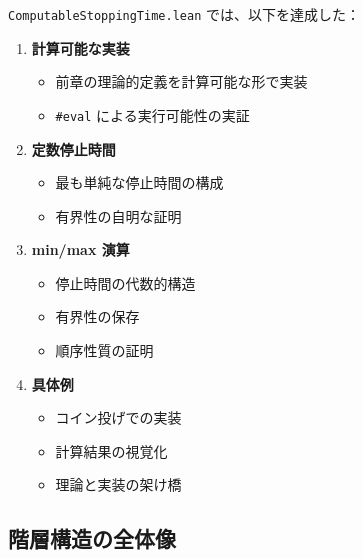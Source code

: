 \documentclass[12pt,a4paper,ja=standard]{bxjsarticle}
\theoremstyle{definition}
\begin{document}
\texttt{ComputableStoppingTime.lean} では、以下を達成した：

\begin{enumerate}
    \item \textbf{計算可能な実装}
    \begin{itemize}
        \item 前章の理論的定義を計算可能な形で実装
        \item \texttt{\#eval} による実行可能性の実証
    \end{itemize}
    
    \item \textbf{定数停止時間}
    \begin{itemize}
        \item 最も単純な停止時間の構成
        \item 有界性の自明な証明
    \end{itemize}
    
    \item \textbf{min/max 演算}
    \begin{itemize}
        \item 停止時間の代数的構造
        \item 有界性の保存
        \item 順序性質の証明
    \end{itemize}
    
    \item \textbf{具体例}
    \begin{itemize}
        \item コイン投げでの実装
        \item 計算結果の視覚化
        \item 理論と実装の架け橋
    \end{itemize}
\end{enumerate}

\subsection{階層構造の全体像}
\end{document}
